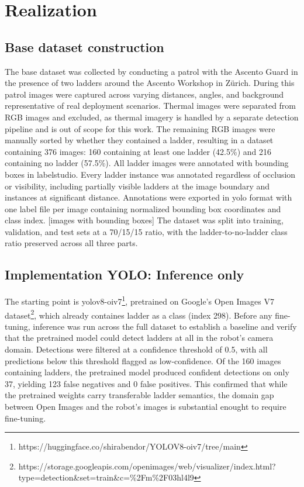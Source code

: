 \chapter{Realization}

\section{Base dataset construction}
The base dataset was collected by conducting a patrol with the Ascento Guard 
in the presence of two ladders around the Ascento Workshop in Zürich. 
During this patrol images were captured across varying distances, angles, 
and background representative of real deployment scenarios. Thermal images 
were separated from RGB images and excluded, as thermal imagery is handled 
by a separate detection pipeline and is out of scope for this work. The 
remaining RGB images were manually sorted by whether they contained a 
ladder, resulting in a dataset containing 376 images: 
160 containing at least one ladder (42.5\%) and 216 containing no ladder (57.5\%).
All ladder images were annotated with bounding boxes in \gls{labelstudio}. 
Every ladder instance was annotated regardless of occlusion or visibility, 
including partially visible ladders at the image boundary and instances at 
significant distance. Annotations were exported in \gls{yolo} format with one 
label file per image containing normalized bounding box coordinates and 
class index.
[images with bounding boxes]
The dataset was split into training, validation, and test sets at a 70/15/15 
ratio, with the ladder-to-no-ladder class ratio preserved across all three parts. 

\section{Implementation YOLO: Inference only}
The starting point is \gls{yolo}v8-oiv7\footnote{https://huggingface.co/shirabendor/YOLOV8-oiv7/tree/main}, pretrained on Google's Open Images V7 dataset\footnote{https://storage.googleapis.com/openimages/web/visualizer/index.html?type=detection&set=train&c=\%2Fm\%2F03hl4l9}, 
which already containes ladder as a class (index 298).
Before any fine-tuning, inference was run across the full dataset to establish a baseline and 
verify that the pretrained model could detect ladders at all in the robot's camera domain. 
Detections were filtered at a confidence threshold of 0.5, with all predictions below this threshold 
flagged as low-confidence. Of the 160 images containing ladders, the pretrained model produced 
confident detections on only 37, yielding 123 false negatives and 0 false positives. 
This confirmed that while the pretrained weights carry transferable ladder semantics, 
the domain gap between Open Images and the robot's images is substantial enought to 
require fine-tuning. 

